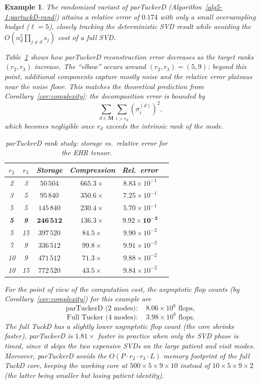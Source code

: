 \documentclass[11pt, oneside]{article}  %
\newtheorem{exm}[thm]{Example}
\newcommand{\caM}{\mathbf{M}}
\begin{document}
\begin{exm}
The randomized variant of parTuckerD (Algorithm~\ref{alg5-1:partuckD-rand}) attains a relative error of $0.174$ with only a small oversampling 
budget ($\ell=5$), closely tracking the deterministic SVD result while avoiding the $O(n_d^2\prod_{j\neq d}s_j)$ cost of a full SVD.

Table~\ref{tab:rankstudy} shows how parTuckerD reconstruction error decreases as the target ranks $(r_2,r_3)$ increase.  The ``elbow'' occurs around $(r_2,r_3)=(5,9)$: beyond this point, additional components capture mostly noise and the relative error plateaus near the noise floor.  This matches the theoretical prediction from Corollary~\ref{cor:complexity}: the decomposition error is bounded by \cite{Lieven2000, Kolda2009} 
\[
\sum_{d\in\caM}\sum_{i>r_d}\left(\sigma_i^{(d)}\right)^{2},
\]
which becomes negligible once $r_d$ exceeds the intrinsic rank of the mode.

\begin{table}[htbp]
\centering
\caption{parTuckerD rank study: storage vs.\ relative error for the EHR tensor.}
\label{tab:rankstudy}
\begin{tabular}{@{}cccccc@{}}
\toprule
$r_2$ & $r_3$ & Storage & Compression & Rel.\ error \\
\midrule
2 & 3  & $50\,504$   & $665.3\times$ & $8.83\times 10^{-1}$ \\
3 & 5  & $95\,840$   & $350.6\times$ & $7.25\times 10^{-1}$ \\
5 & 5  & $145\,840$  & $230.4\times$ & $5.70\times 10^{-1}$ \\
\textbf{5} & \textbf{9}  & $\mathbf{246\,512}$  & $\mathbf{136.3\times}$ & $\mathbf{9.92\times 10^{-2}}$ \\
5 & 15 & $397\,520$  & $84.5\times$  & $9.90\times 10^{-2}$ \\
7 & 9  & $336\,512$  & $99.8\times$  & $9.91\times 10^{-2}$ \\
10& 9  & $471\,512$  & $71.3\times$  & $9.88\times 10^{-2}$ \\
10& 15 & $772\,520$  & $43.5\times$  & $9.84\times 10^{-2}$ \\
\bottomrule
\end{tabular}
\end{table}

For the point of view of the computation cost, the asymptotic flop counts (by Corollary~\ref{cor:complexity}) for this example are 
\[
\text{parTuckerD (2 modes)}:\quad 8.06\times 10^{8}\text{ flops},
\]
\[
\text{Full Tucker (4 modes)}:\quad 3.98\times 10^{8}\text{ flops}.
\]
The full TuckD has a slightly lower asymptotic flop count (the core shrinks faster), parTuckerD is $1.81\times$ faster in practice when only the SVD phase is timed, since it skips the two expensive SVDs on the large patient and visit modes.  Moreover, parTuckerD avoids the $O(P\cdot r_2\cdot r_3\cdot L)$ memory footprint of the full TuckD core, keeping the working core at $500\times 5\times 9\times 10$ instead of $10\times 5\times 9\times 2$ (the latter being smaller but losing patient identity).
\end{exm}
\end{document}
